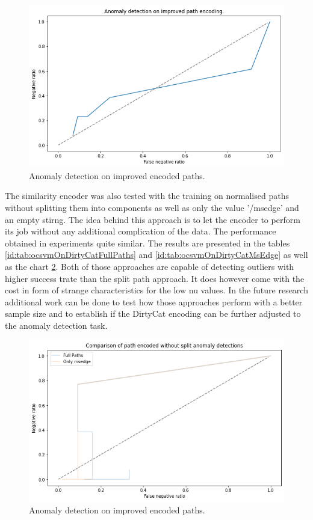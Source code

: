 \documentclass[a4paper,twoside,12pt]{book}
\begin{document}
\begin{figure}
	\centering
	\includegraphics[scale=0.9]{images/OcsvmOnDirtyCatGood}
	\caption{Anomaly detection on improved encoded paths.}
	\label{fig:ocsvmOnDirtyCatGood}
 \end{figure}

The similarity encoder was also tested with the training on normalised paths without splitting 
them into components as well as only the value '/msedge' and an empty stirng. The idea behind this approach
is to let the encoder to perform its job without any additional complication of the data. The performance obtained in
experiments quite similar. The results are presented in the tables \ref{id:tab:ocsvmOnDirtyCatFullPaths} 
and \ref{id:tab:ocsvmOnDirtyCatMsEdge} as well as the chart \ref{fig:ocsvmNoSplitComp}. Both of those approaches
are capable of detecting outliers with higher success trate than the split path approach. It does
however come with the cost in form of strange characteristics for the low nu values. In the future research 
additional work can be done to test how those approaches perform with a better sample size and to
establish if the DirtyCat encoding can be further adjusted to the anomaly detection task.

\begin{figure}
	\centering
	\includegraphics[scale=0.9]{images/OcsvmNoSplitComp}
	\caption{Anomaly detection on improved encoded paths.}
	\label{fig:ocsvmNoSplitComp}
 \end{figure}
 
\end{document}
